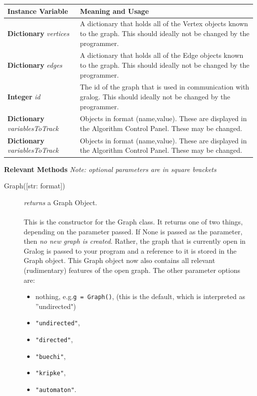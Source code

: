 \documentclass{article}
\newlength\q
\begin{document}
\begin{longtable}{p{\q}p{\q}}
Instance Variable & Meaning and Usage \\ \hline
\textbf{Dictionary} \textit{vertices} & A dictionary that holds all of the Vertex objects known to the graph. This should ideally not be changed by the programmer. \\\hline
\textbf{Dictionary} \textit{edges} & A dictionary that holds all of the Edge objects known to the graph. This should ideally not be changed by the programmer. \\\hline
\textbf{Integer} \textit{id} & The id of the graph that is used in communication with gralog. This should ideally not be changed by the programmer. \\ \hline
\textbf{Dictionary} \textit{variablesToTrack} & Objects in format (name,value). These are displayed in the Algorithm Control Panel. These may be changed. \\ \hline
\textbf{Dictionary} \textit{variablesToTrack} & Objects in format (name,value). These are displayed in the Algorithm Control Panel. These may be changed. \\ \hline
\end{longtable}


\textbf{{\large Relevant Methods}}
\textit{Note: optional parameters are in square brackets}


\begin{description}
\item[Graph({[str: format]})] \emph{returns} a Graph Object.\\\\
This is the constructor for the Graph class. It returns one of two things, depending on the parameter passed. If None is passed as the parameter, then \textit{no new graph is created}. Rather, the graph that is currently open in Gralog is passed to your program and a reference to it is stored in the Graph object. This Graph object now also contains all relevant (rudimentary) features of the open graph. The other parameter options are:
\begin{itemize}
\item nothing, e.g.\@ \texttt{g = Graph()}, (this is the default, which is interpreted as ''undirected")
\item \texttt{"{}undirected"},
\item \texttt{"directed"},
\item \texttt{"buechi"},
\item \texttt{"kripke"},
\item \texttt{"{}automaton"}.
\end{itemize}
\end{description}
\end{document}
